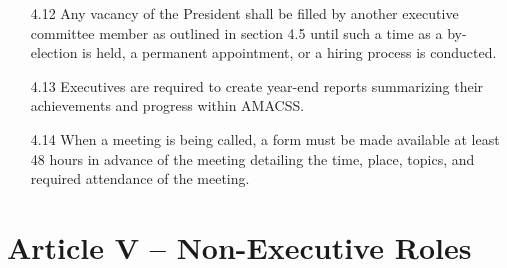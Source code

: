 \documentclass[12pt,a4paper]{article}
\begin{document}
\begin{enumerate}
\item[4.12] Any vacancy of the President shall be filled by another executive committee member as outlined in section 4.5 until such a time as a by-election is held, a permanent appointment, or a hiring process is conducted.

\item[4.13] Executives are required to create year-end reports summarizing their achievements and progress within AMACSS.

\item[4.14] When a meeting is being called, a form must be made available at least 48 hours in advance of the meeting detailing the time, place, topics, and required attendance of the meeting.
\end{enumerate}

\section*{Article V – Non-Executive Roles}
\end{document}
